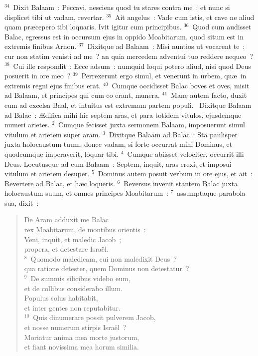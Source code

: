 ${}^{34}$~Dixit Balaam~: Peccavi, nesciens quod tu stares contra me~: et nunc si displicet tibi ut vadam, revertar.
${}^{35}$~Ait angelus~: Vade cum istis, et cave ne aliud quam pr\ae cepero tibi loquaris. Ivit igitur cum principibus.
${}^{36}$~Quod cum audisset Balac, egressus est in occursum ejus in oppido Moabitarum, quod situm est in extremis finibus Arnon.
${}^{37}$~Dixitque ad Balaam~: Misi nuntios ut vocarent te~: cur non statim venisti ad me~? an quia mercedem adventui tuo reddere nequeo~?
${}^{38}$~Cui ille respondit~: Ecce adsum~: numquid loqui potero aliud, nisi quod Deus posuerit in ore meo~?
${}^{39}$~Perrexerunt ergo simul, et venerunt in urbem, qu\ae\ in extremis regni ejus finibus erat.
${}^{40}$~Cumque occidisset Balac boves et oves, misit ad Balaam, et principes qui cum eo erant, munera.
${}^{41}$~Mane autem facto, duxit eum ad excelsa Baal, et intuitus est extremam partem populi.
~Dixitque Balaam ad Balac~: \AE difica mihi hic septem aras, et para totidem vitulos, ejusdemque numeri arietes.
${}^{2}$~Cumque fecisset juxta sermonem Balaam, imposuerunt simul vitulum et arietem super aram.
${}^{3}$~Dixitque Balaam ad Balac~: Sta paulisper juxta holocaustum tuum, donec vadam, si forte occurrat mihi Dominus, et quodcumque imperaverit, loquar tibi.
${}^{4}$~Cumque abiisset velociter, occurrit illi Deus. Locutusque ad eum Balaam~: Septem, inquit, aras erexi, et imposui vitulum et arietem desuper.
${}^{5}$~Dominus autem posuit verbum in ore ejus, et ait~: Revertere ad Balac, et h\ae c loqueris.
${}^{6}$~Reversus invenit stantem Balac juxta holocaustum suum, et omnes principes Moabitarum~:
${}^{7}$~assumptaque parabola sua, dixit~: \begin{flushleft}\begin{verse}De Aram adduxit me Balac\\ rex Moabitarum, de montibus orientis~:\\ Veni, inquit, et maledic Jacob~;\\ propera, et detestare Isra\"el.\\
${}^{8}$~Quomodo maledicam, cui non maledixit Deus~?\\ qua ratione detester, quem Dominus non detestatur~?\\
${}^{9}$~De summis silicibus videbo eum,\\ et de collibus considerabo illum.\\ Populus solus habitabit,\\ et inter gentes non reputabitur.\\
${}^{10}$~Quis dinumerare possit pulverem Jacob,\\ et nosse numerum stirpis Isra\"el~?\\ Moriatur anima mea morte justorum,\\ et fiant novissima mea horum similia.\end{verse}\end{flushleft}


